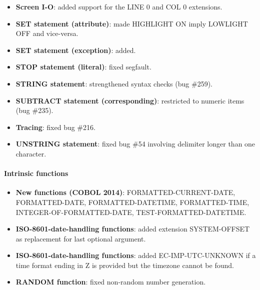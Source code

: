 \begin{itemize}
\item \textbf{Screen I-O}: added support for the LINE 0 and COL 0 extensions.
\item \textbf{SET statement (attribute)}: made HIGHLIGHT ON imply LOWLIGHT OFF and vice-versa.
\item \textbf{SET statement (exception)}: added.
\item \textbf{STOP statement (literal)}: fixed segfault.
\item \textbf{STRING statement}: strengthened syntax checks (bug \#259).
\item \textbf{SUBTRACT statement (corresponding)}: restricted to numeric items (bug \#235).
\item \textbf{Tracing}: fixed bug \#216.
\item \textbf{UNSTRING statement}: fixed bug \#54 involving delimiter longer than one character.
\end{itemize}

\paragraph{Intrinsic functions}
\begin{itemize}
\item \textbf{New functions (COBOL 2014)}: FORMATTED-CURRENT-DATE, FORMATTED-DATE, FORMATTED-DATETIME, FORMATTED-TIME, INTEGER-OF-FORMATTED-DATE, TEST-FORMATTED-DATETIME.
\item \textbf{ISO-8601-date-handling functions}: added extension SYSTEM-OFFSET as replacement for last optional argument.
\item \textbf{ISO-8601-date-handling functions}: added EC-IMP-UTC-UNKNOWN if a time format ending in Z is provided but the timezone cannot be found.
\item \textbf{RANDOM function}: fixed non-random number generation.
\end{itemize}

